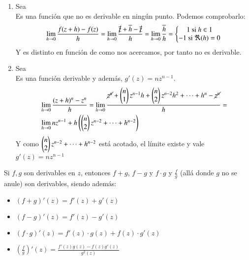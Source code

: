 \begin{eg}$ $
    \begin{enumerate}[1)]
        \item Sea\\
        Es una función que no es derivable en ningún punto. Podemos comprobarlo:
        $$
            \lim_{h\to 0} \frac{f(z+h)-f(z)}{h} = \lim_{h \to 0} \frac{\cancel{\cnj z} + \cnj h - \cancel{\cnj z}}{h} = \lim_{h\to 0} \frac{\cnj h}{h} = \left\{ \Mx{
            1 \text{ si } h \in \R\\
            -1 \text{ si } \Re(h) = 0
            } \right.
        $$
        Y es distinto en función de como nos acercamos, por tanto no es derivable.
        \item Sea\\
        Es una función derivable y además, $g'(z) = n z^{n-1}$.
        \begin{align*}
            &\lim_{h\to 0} \frac{(z+h)^n - z^n}{h} = \lim_{h\to 0} \frac{\cancel{z^n} + \px{n\\1} z^{n-1}h + \px{n\\2}z^{n-2}h^2 + \cdots + h^n - \cancel{z^n}}{h} =\\
            &\lim_{h\to 0} nz^{n-1} + h \px{\px{n\\2}z^{n-2} + \cdots + h^{n-2}}
        \end{align*}
        Y como $\px{n\\2}z^{n-2} + \cdots + h^{n-2}$ está acotado, el límite existe y vale $g'(z) = nz^{n-1}$
    \end{enumerate}
\end{eg}

\begin{pro}
    Si $f, g$ son derivables en $z$, entonces $f+g$, $f-g$ y $f\cdot g$ y $\frac{f}{g}$ (allá donde $g$ no se anule) son derivables, siendo además:
    \begin{itemize}
        \item $(f+g)'(z) = f'(z) + g'(z)$
        \item $(f-g)'(z) = f'(z) - g'(z)$
        \item $(f\cdot g)'(z) = f'(z)\cdot g(z) + f(z) \cdot g'(z)$
        \item $(\frac{f}{g})'(z) = \frac{f'(z)g(z) - f(z)g'(z)}{g^2(z)}$
    \end{itemize}
\end{pro}

